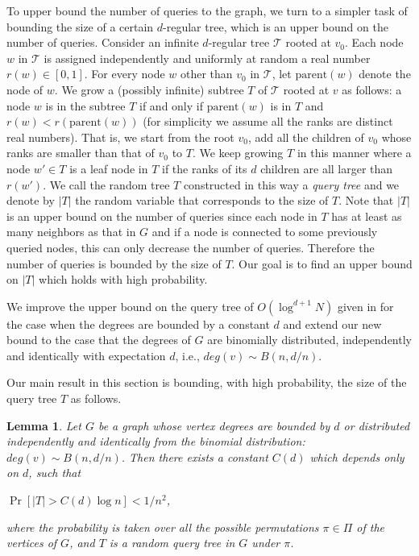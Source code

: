 \documentclass[english, oribibl]{llncs}
\newtheorem{lemma}[theorem]{Lemma}
\begin{document}
To upper bound the number of queries to the graph, we turn to a simpler task of bounding the size
of a certain $d$-regular tree, which is an upper bound on the number of queries.
Consider an infinite $d$-regular tree $\mathcal{T}$ rooted at $v_{0}$.
Each node $w$ in $\mathcal{T}$ is assigned independently and uniformly at random a real number
$r(w)\in [0,1]$.
For every node $w$ other than $v_{0}$ in $\mathcal{T}$,
let $\text{parent}(w)$ denote the  node of $w$.
We grow a (possibly infinite) subtree $T$ of $\mathcal{T}$ rooted at $v$ as follows:
a node $w$ is in the subtree $T$ if and only if $\text{parent}(w)$ is in $T$ and
$r(w)<r(\text{parent}(w))$ (for simplicity we assume all the ranks are distinct real numbers).
That is, we start from the root $v_0$, add all the children of $v_0$ whose ranks are smaller than that
of $v_0$ to $T$. We keep growing $T$ in this manner where a node $w'\in T$ is a leaf node in $T$
if the ranks of its $d$ children are all larger than $r(w')$.
We call the random tree $T$ constructed in this way a \emph{query tree} and
we denote by $|T|$ the random variable that corresponds to the size of $T$.
Note that $|T|$ is an upper bound on the number of queries since
each node in $T$ has at least as many neighbors as that in $G$ and
if a node is connected to some previously queried nodes, this can only decrease
the number of queries. Therefore the number of queries is bounded by the size of $T$.
Our goal is to find an upper bound on $|T|$ which holds with high probability. 


We improve the upper bound on the query tree of $O(\log^{d+1}{N})$ given in \cite{ARV+11}  for the case when the degrees are bounded by a constant $d$
and extend our new bound to the case that the degrees of $G$ are binomially distributed, independently and identically with expectation $d$, i.e.,
$deg(v) \sim B(n, d/n)$.


Our main result in this section is bounding, with high probability, the size of the query tree $T$ as follows. 















\begin{lemma}
\label{lemma:boundomial}
Let $G$ be a graph whose vertex degrees are bounded by $d$ or distributed independently and identically from the binomial distribution:  $deg(v) \sim B(n,d/n)$. Then there exists a constant $C(d)$ which depends only on $d$, such that
\begin{center}
$\Pr[|T|>C(d)\log{n}]<1/n^2$,
\end{center}
where the probability is taken over all the possible permutations $\pi \in \Pi$ of the vertices of $G$, and $T$ is a random query tree in $G$ under $\pi$.
\end{lemma}
\end{document}
